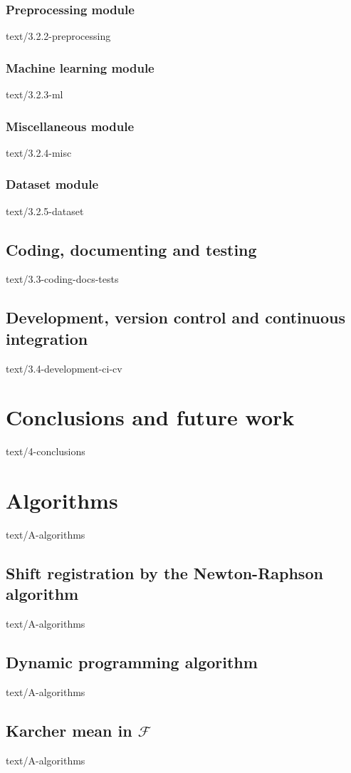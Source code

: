 \documentclass[epsbased,copyleft,final,loe, lof,extendedindex,firstnumbered,tfg,english]{tfgtfmthesisuam}
\begin{document}
  \subsection{Preprocessing module\label{SEC:PREPMOD}}{text/3.2.2-preprocessing}
  \subsection{Machine learning module\label{SEC:MLMOD}}{text/3.2.3-ml}
  \subsection{Miscellaneous module\label{SEC:MISCMOD}}{text/3.2.4-misc}
  \subsection{Dataset module\label{SEC:DATAMOD}}{text/3.2.5-dataset}
\section{Coding, documenting and testing\label{SEC:CODING}}{text/3.3-coding-docs-tests}
\section{Development, version control and continuous integration\label{SEC:DEVELOPMENT}}{text/3.4-development-ci-cv}

\chapter{Conclusions and future work\label{CAP:CONCLUSIONS}}{text/4-conclusions}

\appendix

\chapter{Algorithms\label{CAP:ALGORITHMS}}{text/A-algorithms}
  \section{Shift registration by the Newton-Raphson algorithm\label{SEC:NEWTON}}{text/A-algorithms}
  \section{Dynamic programming algorithm\label{SEC:DPA}}{text/A-algorithms}
  \section{Karcher mean in $\mathcal{F}$\label{SEC:KARCHERF}}{text/A-algorithms}
\end{document}
